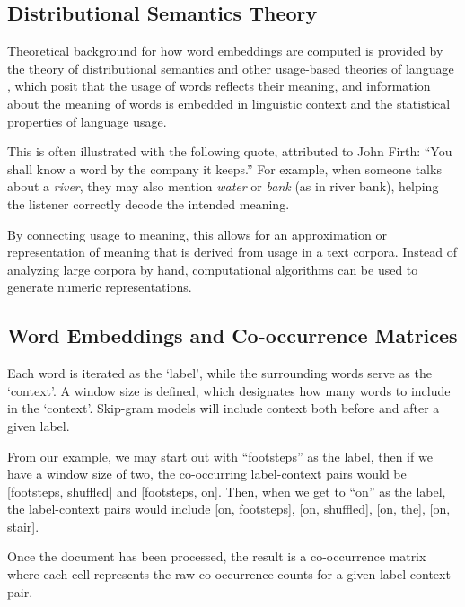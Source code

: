  
\subsection{Distributional Semantics Theory}

Theoretical background for how word embeddings are computed is provided by the theory of distributional semantics \cite{harris1954distributional, firth1957synopsis} and other usage-based theories of language \cite{wittgenstein1953philosophical}, which posit that the usage of words reflects their meaning, and information about the meaning of words is embedded in linguistic context and the statistical properties of language usage.

This is often illustrated with the following quote, attributed to John Firth: ``You shall know a word by the company it keeps.'' For example, when someone talks about a \textit{river}, they may also mention \textit{water} or \textit{bank} (as in river bank), helping the listener correctly decode the intended meaning.

By connecting usage to meaning, this allows for an approximation or representation of meaning that is derived from usage in a text corpora. Instead of analyzing large corpora by hand, computational algorithms can be used to generate numeric representations.

\subsection{Word Embeddings and Co-occurrence Matrices}

Each word is iterated as the `label', while the surrounding words serve as the `context'. A window size is defined, which designates how many words to include in the `context'. Skip-gram models will include context both before and after a given label.

From our example, we may start out with ``footsteps'' as the label, then if we have a window size of two, the co-occurring label-context pairs would be [footsteps, shuffled] and [footsteps, on].
Then, when we get to ``on'' as the label, the label-context pairs would include [on, footsteps], [on, shuffled], [on, the], [on, stair].

Once the document has been processed, the result is a co-occurrence matrix where each cell represents the raw co-occurrence counts for a given label-context pair.

